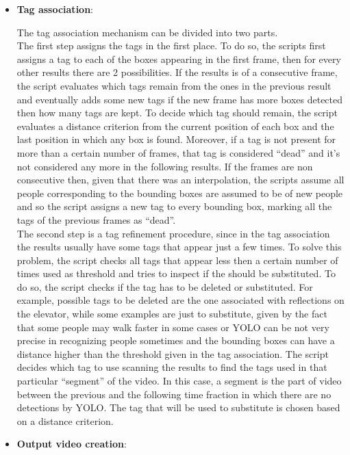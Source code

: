 \documentclass[conference]{IEEEtran}
\begin{document}
\begin{itemize}
			\item \textbf{Tag association}:
				
				The tag association mechanism can be divided into two parts.\\
				The first step assigns the tags in the first place. To do so, the scripts first assigns a tag to each of the boxes appearing in the first frame, then 
				for every other results there are 2 possibilities. If the results is of a consecutive frame, the script evaluates which tags
				remain from the ones in the previous result and eventually adds some new tags if the new frame has more boxes detected then how many tags are kept. 
				To decide which tag should remain, the script evaluates a distance criterion from the current position of each box and the last position in which any box is found.
				Moreover, if a tag is not present for more than a certain number of frames, that tag is considered ``dead'' and it's not considered any more in the following 
				results. If the frames are non consecutive then, given that there was an interpolation, the scripts assume all people corresponding to the bounding boxes are assumed 
				to be of new people and so the script assigns a new tag to every bounding box, marking all the tags of the previous frames as ``dead''.\\
				The second step is a tag refinement procedure, since in the tag association the results usually have some tags that appear just a few times. To solve this 
				problem, the script checks all tags that appear less then a certain number of times used as threshold and tries to inspect if the should be substituted. 
				To do so, the script checks if the tag has to be deleted or substituted. For example, possible tags to be deleted are the one associated with reflections 
				on the elevator, while some examples are just to substitute, given by the fact that some people may walk faster in some cases or YOLO can be not very precise in
				recognizing people sometimes and the bounding boxes can have a distance higher than the threshold given in the tag association. The script decides which tag to use 
				scanning the results to find the tags used in that particular ``segment'' of the video. In this case, a segment is the part of video between the previous 
				and the following time fraction in which there are no detections by YOLO. The tag that will be used to substitute is chosen based on a distance criterion.
				
			\item \textbf{Output video creation}:
			

\end{itemize}
\end{document}
